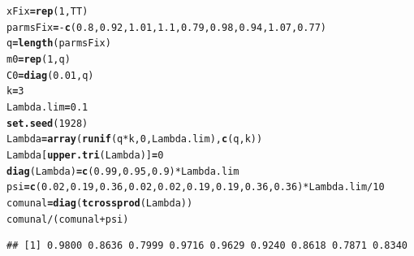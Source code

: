 \documentclass{article}\usepackage[]{graphicx}\usepackage[]{color}
\makeatletter
\newcommand{\hlnum}[1]{\textcolor[rgb]{0.125,0.125,1}{#1}}%
\newcommand{\hlopt}[1]{\textcolor[rgb]{0.251,0.251,0.282}{#1}}%
\newcommand{\hlstd}[1]{\textcolor[rgb]{0.251,0.251,0.282}{#1}}%
\newcommand{\hlkwb}[1]{\textcolor[rgb]{0.439,0.251,1}{\textbf{#1}}}%
\newcommand{\hlkwd}[1]{\textcolor[rgb]{0.251,0.251,0.282}{\textbf{#1}}}%
\newenvironment{kframe}{%
 \def\at@end@of@kframe{}%
 \ifinner\ifhmode%
  \def\at@end@of@kframe{\end{minipage}}%
  \begin{minipage}{\columnwidth}%
 \fi\fi%
 \def\FrameCommand##1{\hskip\@totalleftmargin \hskip-\fboxsep
 \colorbox{shadecolor}{##1}\hskip-\fboxsep
     \hskip-\linewidth \hskip-\@totalleftmargin \hskip\columnwidth}%
 \MakeFramed {\advance\hsize-\width
   \@totalleftmargin\z@ \linewidth\hsize
   \@setminipage}}%
 {\par\unskip\endMakeFramed%
 \at@end@of@kframe}
\newenvironment{knitrout}{}{} %
\makeatother
\begin{document}
\begin{knitrout}
\color{fgcolor}\begin{kframe}
\begin{alltt}
\hlstd{xFix} \hlkwb{=} \hlkwd{rep}\hlstd{(}\hlnum{1}\hlstd{, TT)}
\hlstd{parmsFix} \hlkwb{=} \hlopt{-}\hlkwd{c}\hlstd{(}\hlnum{0.8}\hlstd{,} \hlnum{0.92}\hlstd{,} \hlnum{1.01}\hlstd{,} \hlnum{1.1}\hlstd{,} \hlnum{0.79}\hlstd{,} \hlnum{0.98}\hlstd{,} \hlnum{0.94}\hlstd{,} \hlnum{1.07}\hlstd{,} \hlnum{0.77}\hlstd{)}
\hlstd{q} \hlkwb{=} \hlkwd{length}\hlstd{(parmsFix)}
\hlstd{m0} \hlkwb{=} \hlkwd{rep}\hlstd{(}\hlnum{1}\hlstd{, q)}
\hlstd{C0} \hlkwb{=} \hlkwd{diag}\hlstd{(}\hlnum{0.01}\hlstd{, q)}
\hlstd{k} \hlkwb{=} \hlnum{3}
\hlstd{Lambda.lim} \hlkwb{=} \hlnum{0.1}
\hlkwd{set.seed}\hlstd{(}\hlnum{1928}\hlstd{)}
\hlstd{Lambda} \hlkwb{=} \hlkwd{array}\hlstd{(}\hlkwd{runif}\hlstd{(q} \hlopt{*} \hlstd{k,} \hlnum{0}\hlstd{, Lambda.lim),} \hlkwd{c}\hlstd{(q, k))}
\hlstd{Lambda[}\hlkwd{upper.tri}\hlstd{(Lambda)]} \hlkwb{=} \hlnum{0}
\hlkwd{diag}\hlstd{(Lambda)} \hlkwb{=} \hlkwd{c}\hlstd{(}\hlnum{0.99}\hlstd{,} \hlnum{0.95}\hlstd{,} \hlnum{0.9}\hlstd{)} \hlopt{*} \hlstd{Lambda.lim}
\hlstd{psi} \hlkwb{=} \hlkwd{c}\hlstd{(}\hlnum{0.02}\hlstd{,} \hlnum{0.19}\hlstd{,} \hlnum{0.36}\hlstd{,} \hlnum{0.02}\hlstd{,} \hlnum{0.02}\hlstd{,} \hlnum{0.19}\hlstd{,} \hlnum{0.19}\hlstd{,} \hlnum{0.36}\hlstd{,} \hlnum{0.36}\hlstd{)} \hlopt{*} \hlstd{Lambda.lim}\hlopt{/}\hlnum{10}
\hlstd{comunal} \hlkwb{=} \hlkwd{diag}\hlstd{(}\hlkwd{tcrossprod}\hlstd{(Lambda))}
\hlstd{comunal}\hlopt{/}\hlstd{(comunal} \hlopt{+} \hlstd{psi)}
\end{alltt}
\begin{verbatim}
## [1] 0.9800 0.8636 0.7999 0.9716 0.9629 0.9240 0.8618 0.7871 0.8340
\end{verbatim}
\end{kframe}
\end{knitrout}
\end{document}
